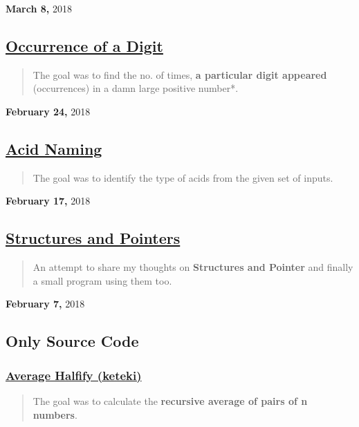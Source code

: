\documentclass[11pt]{article}
\begin{document}
\textbf{March 8,} 2018

\subsection{\href{https://imahajanshubham.github.io/docs/lang/c-c++/occurrences\_of\_a\_digit.html}{Occurrence of a Digit}}
\label{sec:orgb6ec1f7}
\begin{quote}
The goal was to find the no. of times, \textbf{a particular digit appeared} (occurrences)
in a damn large positive number*.
\end{quote}

\textbf{February 24,} 2018

\subsection{\href{https://imahajanshubham.github.io/docs/lang/c-c++/acid\_naming.html}{Acid Naming}}
\label{sec:org21f00c5}
\begin{quote}
The goal was to identify the type of acids from the given set of inputs.
\end{quote}

\textbf{February 17,} 2018

\subsection{\href{https://imahajanshubham.github.io/docs/lang/c-c++/structures.html}{Structures and Pointers}}
\label{sec:orgabfda19}
\begin{quote}
An attempt to share my thoughts on \textbf{Structures and Pointer} and finally a small
program using them too.
\end{quote}

\textbf{February 7,} 2018

\subsection{Only Source Code}
\label{sec:orgd4dec8f}
\subsubsection{\href{https://imahajanshubham.github.io/docs/lang/c-c++/only\_source\_code/average\_halfify.html}{Average Halfify (keteki)}}
\label{sec:org5b93f9d}
\begin{quote}
The goal was to calculate the \textbf{recursive average of pairs of n numbers}.
\end{quote}
\end{document}
